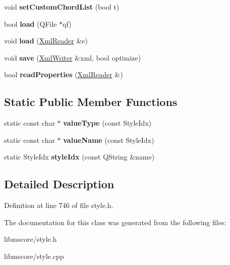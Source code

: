 \begin{DoxyCompactItemize}
\item 
\mbox{\label{class_ms_1_1_m_style_a8d7aebd5bd379ef2fc5f949448f417f1}} 
void {\bfseries set\+Custom\+Chord\+List} (bool t)
\item 
\mbox{\label{class_ms_1_1_m_style_a63e09dc10c60e687fb791a2fbab41f77}} 
bool {\bfseries load} (Q\+File $\ast$qf)
\item 
\mbox{\label{class_ms_1_1_m_style_a04a9dbbf8528694b309516952d3fcb83}} 
void {\bfseries load} (\hyperlink{class_ms_1_1_xml_reader}{Xml\+Reader} \&e)
\item 
\mbox{\label{class_ms_1_1_m_style_a2a2d58a811603b8c38d9ceed2c3086f5}} 
void {\bfseries save} (\hyperlink{class_ms_1_1_xml_writer}{Xml\+Writer} \&xml, bool optimize)
\item 
\mbox{\label{class_ms_1_1_m_style_a36407a3599f3171b067a821d30dd0ef9}} 
bool {\bfseries read\+Properties} (\hyperlink{class_ms_1_1_xml_reader}{Xml\+Reader} \&)
\end{DoxyCompactItemize}
\subsection*{Static Public Member Functions}
\begin{DoxyCompactItemize}
\item 
\mbox{\label{class_ms_1_1_m_style_a47dae0f581ea23bd6b1dc9004802bb52}} 
static const char $\ast$ {\bfseries value\+Type} (const Style\+Idx)
\item 
\mbox{\label{class_ms_1_1_m_style_a01c2d332f826e13dc4beaaba05e68ba8}} 
static const char $\ast$ {\bfseries value\+Name} (const Style\+Idx)
\item 
\mbox{\label{class_ms_1_1_m_style_aac8559d1f915b908e9177f50ed21817a}} 
static Style\+Idx {\bfseries style\+Idx} (const Q\+String \&name)
\end{DoxyCompactItemize}


\subsection{Detailed Description}


Definition at line 746 of file style.\+h.



The documentation for this class was generated from the following files\+:\begin{DoxyCompactItemize}
\item 
libmscore/style.\+h\item 
libmscore/style.\+cpp\end{DoxyCompactItemize}

